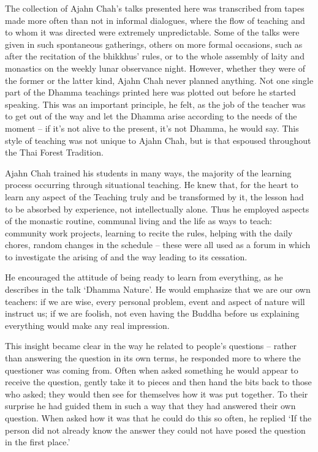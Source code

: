 The collection of Ajahn Chah's talks presented here was transcribed from tapes made more often than not in informal dialogues, where the flow of teaching and to whom it was directed were extremely unpredictable. Some of the talks were given in such spontaneous gatherings, others on more formal occasions, such as after the recitation of the bhikkhus' rules, or to the whole assembly of laity and monastics on the weekly lunar observance night. However, whether they were of the former or the latter kind, Ajahn Chah never planned anything. Not one single part of the Dhamma teachings printed here was plotted out before he started speaking. This was an important principle, he felt, as the job of the teacher was to get out of the way and let the Dhamma arise according to the needs of the moment -- if it's not alive to the present, it's not Dhamma, he would say. This style of teaching was not unique to Ajahn Chah, but is that espoused throughout the Thai Forest Tradition.

Ajahn Chah trained his students in many ways, the majority of the learning process occurring through situational teaching. He knew that, for the heart to learn any aspect of the Teaching truly and be transformed by it, the lesson had to be absorbed by experience, not intellectually alone. Thus he employed aspects of the monastic routine, communal living and the  life as ways to teach: community work projects, learning to recite the rules, helping with the daily chores, random changes in the schedule -- these were all used as a forum in which to investigate the arising of  and the way leading to its cessation.

He encouraged the attitude of being ready to learn from everything, as he describes in the talk `Dhamma Nature'. He would emphasize that we are our own teachers: if we are wise, every personal problem, event and aspect of nature will instruct us; if we are foolish, not even having the Buddha before us explaining everything would make any real impression.

This insight became clear in the way he related to people's questions -- rather than answering the question in its own terms, he responded more to where the questioner was coming from. Often when asked something he would appear to receive the question, gently take it to pieces and then hand the bits back to those who asked; they would then see for themselves how it was put together. To their surprise he had guided them in such a way that they had answered their own question. When asked how it was that he could do this so often, he replied `If the person did not already know the answer they could not have posed the question in the first place.'

